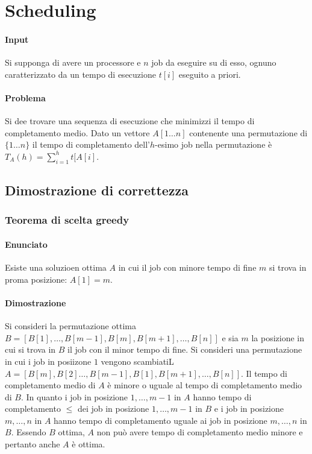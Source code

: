 \section{Scheduling}
\paragraph{Input}
Si supponga di avere un processore e $n$ job da eseguire su di esso, ognuno caratterizzato da un tempo di esecuzione $t[i]$ eseguito a priori.
\paragraph{Problema}
Si dee trovare una sequenza di esecuzione che minimizzi il tempo di completamento medio. Dato un vettore $A[1\dots n]$ contenente una permutazione di $\{1\dots n\}$ il tempo di 
completamento dell'$h$-esimo job nella permutazione \`e $T_A(h) = \sum\limits_{i = 1}^h t[A[i]$. 
\subsection{Dimostrazione di correttezza}
\subsubsection{Teorema di scelta greedy}
\paragraph{Enunciato}
Esiste una soluzioen ottima $A$ in cui il job con minore tempo di fine $m$ si trova in proma posizione: $A[1] = m$.
\paragraph{Dimostrazione}
Si consideri la permutazione ottima $B = [B[1], \dots, B[m-1], B[m], B[m+1], \dots, B[n]]$ e sia $m$ la posizione in cui si trova in $B$ il job con il minor tempo di fine. Si consideri
una permutazione in cui i job in posiizone $1$ vengono scambiatiL $A =[B[m], B[2] \dots, B[m-1], B[1], B[m+1], \dots, B[n]]$. Il tempo di completamento medio di $A$ \`e minore o uguale
al tempo di completamento medio di $B$. In quanto i job in posizione $1, \dots, m-1$ in $A$ hanno tempo di completamento $\le$ dei job in posizione $1, \dots, m-1$ in $B$ e i job in
posizione $m, \dots, n$ in $A$ hanno tempo di completamento uguale ai job in posizione $m, \dots, n$ in $B$. Essendo $B$ ottima, $A$ non pu\`o avere tempo di completamento medio minore
e pertanto anche $A$ \`e ottima. 
